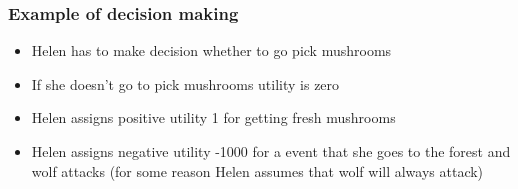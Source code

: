 \documentclass[10pt,handout]{beamer}
\begin{document}
\begin{frame}

\frametitle{Example of decision making}

  \begin{itemize}
  \item<+-> Helen has to make decision whether to go pick mushrooms
  \item<+-> If she doesn't go to pick mushrooms utility is zero
  \item<+-> Helen assigns positive utility 1 for getting fresh mushrooms
  \item<+-> Helen assigns negative utility -1000 for a event that she goes to the forest and wolf attacks (for some reason Helen assumes that wolf will always attack)\\
    \vspace{\baselineskip}
    ~\\
    \vspace{\baselineskip}
  \end{itemize}

\end{frame}
\end{document}
